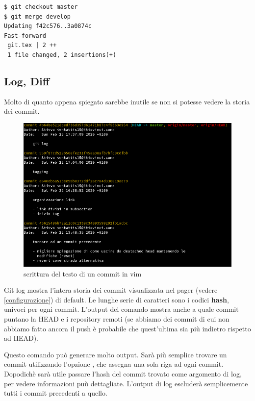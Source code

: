 \documentclass{article} \usepackage[textwidth=19cm,textheight=24cm]{geometry}
\begin{document}
\begin{verbatim}
$ git checkout master
$ git merge develop
Updating f42c576..3a0874c
Fast-forward
 git.tex | 2 ++
 1 file changed, 2 insertions(+)
\end{verbatim}

\subsection{Log, Diff\label{log}}

Molto di quanto appena spiegato sarebbe inutile se non si potesse vedere la
storia dei commit.

\begin{figure}
\includegraphics[width=6in]{logOutput.png}
\centering
\caption{scrittura del testo di un commit in vim}
\end{figure}

Git log mostra l'intera storia dei commit visualizzata nel pager (vedere 
\ref{configurazione}) di default.
Le lunghe serie di caratteri sono i codici \textbf{hash}, univoci per ogni
commit. L'output del comando mostra anche a quale commit puntano la HEAD e i
repository remoti (se abbiamo dei commit di cui non abbiamo fatto ancora il push
è probabile che quest'ultima sia più indietro rispetto ad HEAD).

Questo comando può generare molto output. Sarà più semplice trovare un commit
utilizzando l'opzione , che assegna una sola
riga ad ogni commit. Dopodichè sarà utile passare l'hash del commit trovato come
argomento di log, per vedere informazioni puù dettagliate. L'output di log
escluderà semplicemente tutti i commit precedenti a quello.
\end{document}
